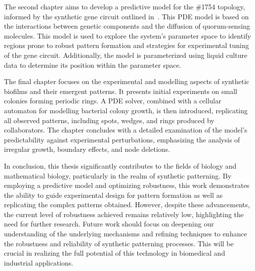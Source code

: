 The second chapter aims to develop a predictive model for the \#1754 topology, informed by the synthetic gene circuit outlined in~\cite{Tica2020}.
This PDE model is based on the interactions between genetic components and the diffusion of quorum-sensing molecules.
This model is used to explore the system's parameter space to identify regions prone to robust pattern formation and strategies for experimental tuning of the gene circuit.
Additionally, the model is parameterized using liquid culture data to determine its position within the parameter space.

The final chapter focuses on the experimental and modelling aspects of synthetic biofilms and their emergent patterns.
It presents initial experiments on small colonies forming periodic rings.
A PDE solver, combined with a cellular automaton for modelling bacterial colony growth, is then introduced, replicating all observed patterns, including spots, wedges, and rings produced by collaborators.
The chapter concludes with a detailed examination of the model's predictability against experimental perturbations, emphasizing the analysis of irregular growth, boundary effects, and node deletions.

In conclusion, this thesis significantly contributes to the fields of biology and mathematical biology, particularly in the realm of synthetic patterning.
By employing a predictive model and optimizing robustness, this work demonstrates the ability to guide experimental design for pattern formation as well as replicating the complex patterns obtained.
However, despite these advancements, the current level of robustness achieved remains relatively low, highlighting the need for further research.
Future work should focus on deepening our understanding of the underlying mechanisms and refining techniques to enhance the robustness and reliability of synthetic patterning processes.
This will be crucial in realizing the full potential of this technology in biomedical and industrial applications.

